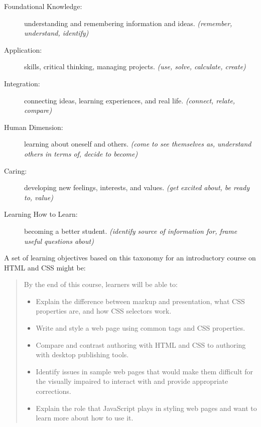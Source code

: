 \begin{description}

  \item[Foundational Knowledge:] understanding and remembering
    information and ideas.
    \emph{(remember, understand, identify)}

  \item[Application:] skills, critical thinking, managing projects.
    \emph{(use, solve, calculate, create)}

  \item[Integration:] connecting ideas, learning experiences, and real
    life.
    \emph{(connect, relate, compare)}

  \item[Human Dimension:] learning about oneself and others.
    \emph{(come to see themselves as, understand others in terms of,
      decide to become)}

  \item[Caring:] developing new feelings, interests, and values.
    \emph{(get excited about, be ready to, value)}

  \item[Learning How to Learn:] becoming a better student.
    \emph{(identify source of information for, frame useful questions
      about)}

\end{description}

\noindent
A set of learning objectives based on this taxonomy for an
introductory course on HTML and CSS might be:

\newpage %

\begin{quote}
  By the end of this course, learners will be able to:

  \begin{itemize}

  \item
    Explain the difference between markup and presentation, what CSS
    properties are, and how CSS selectors work.

  \item
    Write and style a web page using common tags and CSS properties.

  \item
    Compare and contrast authoring with HTML and CSS to authoring with
    desktop publishing tools.

  \item
    Identify issues in sample web pages that would make them difficult
    for the visually impaired to interact with and provide appropriate
    corrections.

  \item
    Explain the role that JavaScript plays in styling web pages and
    want to learn more about how to use it.

  \end{itemize}
\end{quote}

